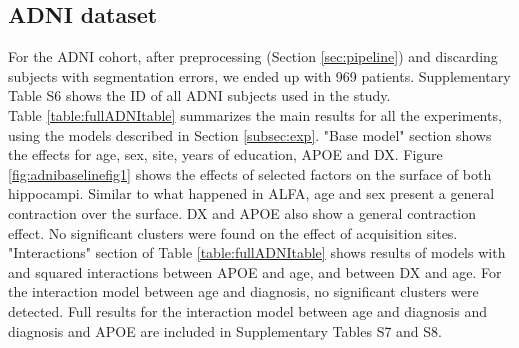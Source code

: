 \subsection{ADNI dataset}

For the ADNI cohort, after preprocessing (Section \ref{sec:pipeline}) and discarding subjects with segmentation errors, we ended up with 969 patients. Supplementary Table S6 shows the ID of all ADNI subjects used in the study. \\

Table \ref{table:fullADNItable} summarizes the main results for all the experiments, using the models described in Section \ref{subsec:exp}. "Base model" section shows the effects for age, sex, site, years of education, APOE and DX. Figure \ref{fig:adnibaselinefig1} shows the effects of selected factors on the surface of both hippocampi. Similar to what happened in ALFA, age and sex present a general contraction over the surface. DX and APOE also show a general contraction effect. No significant clusters were found on the effect of acquisition sites. "Interactions" section of Table \ref{table:fullADNItable} shows results of models with and squared interactions between APOE and age, and between DX and age. For the interaction model between age and diagnosis, no significant clusters were detected. Full results for the interaction model between age and diagnosis and diagnosis and APOE are included in Supplementary Tables S7 and S8. \\


